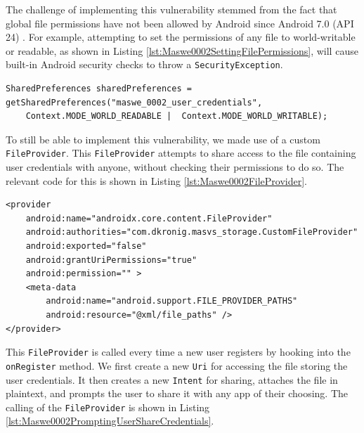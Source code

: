 The challenge of implementing this vulnerability stemmed from the fact that global file permissions have not been allowed by Android since Android 7.0 (API 24) \cite{android_deprecated_world_file_permissions}. For example, attempting to set the permissions of any file to world-writable or readable, as shown in Listing \ref{lst:Maswe0002SettingFilePermissions}, will cause built-in Android security checks to throw a \texttt{SecurityException}.

\begin{lstlisting}[style=JavaStyle, float=tbh, mathescape=true, captionpos=b, caption={Attempting to set permissions of a file to world read and writable}, label=lst:Maswe0002SettingFilePermissions]
SharedPreferences sharedPreferences = getSharedPreferences("maswe_0002_user_credentials", 
    Context.MODE_WORLD_READABLE |  Context.MODE_WORLD_WRITABLE);
\end{lstlisting}

To still be able to implement this vulnerability, we made use of a custom \texttt{FileProvider}. This \texttt{FileProvider} attempts to share access to the file containing user credentials with anyone, without checking their permissions to do so. The relevant code for this is shown in Listing \ref{lst:Maswe0002FileProvider}.

\begin{lstlisting}[float=tbh, style=XMLStyle, mathescape=true, captionpos=b, caption={Custom \texttt{FileProvider} that grants \texttt{Uri} permissions without checking access permissions}, label=lst:Maswe0002FileProvider]
<provider
    android:name="androidx.core.content.FileProvider"
    android:authorities="com.dkronig.masvs_storage.CustomFileProvider"
    android:exported="false"
    android:grantUriPermissions="true"
    android:permission="" >
    <meta-data
        android:name="android.support.FILE_PROVIDER_PATHS"
        android:resource="@xml/file_paths" />
</provider>
\end{lstlisting}

This \texttt{FileProvider} is called every time a new user registers by hooking into the \texttt{onRegister} method. We first create a new \texttt{Uri} for accessing the file storing the user credentials. It then creates a new \texttt{Intent} for sharing, attaches the file in plaintext, and prompts the user to share it with any app of their choosing. The calling of the \texttt{FileProvider} is shown in Listing \ref{lst:Maswe0002PromptingUserShareCredentials}.

